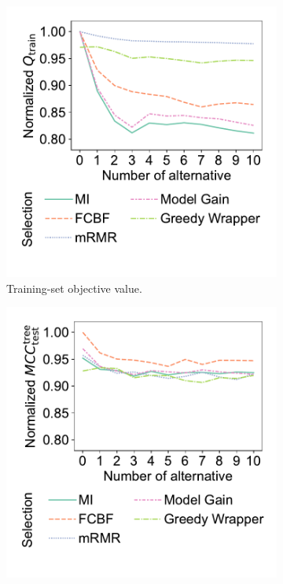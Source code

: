 \documentclass{article}
\theoremstyle{definition}
\begin{document}
\begin{figure}[htb]
	\centering
	\begin{subfigure}[t]{0.48\textwidth}
		\centering
		\includegraphics[width=\textwidth, trim=20 40 15 15, clip]{plots/impact-num-alternatives-fs-method-train-objective-max.pdf}
		\caption{Training-set objective value.}
		\label{fig:afs:impact-num-alternatives-fs-method-train-objective-max}
	\end{subfigure}
	\hfill
	\begin{subfigure}[t]{0.48\textwidth}
		\centering
		\includegraphics[width=\textwidth, trim=20 40 15 15, clip]{plots/impact-num-alternatives-fs-method-decision-tree-test-mcc-max.pdf}

\end{subfigure}
\end{figure}
\end{document}
